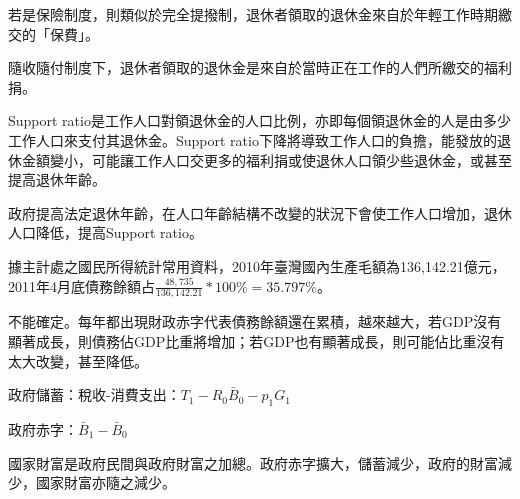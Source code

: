 \documentclass[12pt]{article}
\begin{document}
\begin{CJK}{UTF8}{cwmb}
\begin{num}
\item 
	\begin{num}
		\item 若是保險制度，則類似於完全提撥制，退休者領取的退休金來自於年輕工作時期繳交的「保費」。
		\item 隨收隨付制度下，退休者領取的退休金是來自於當時正在工作的人們所繳交的福利捐。
		\item Support ratio是工作人口對領退休金的人口比例，亦即每個領退休金的人是由多少工作人口來支付其退休金。Support ratio下降將導致工作人口的負擔，能發放的退休金額變小，可能讓工作人口交更多的福利捐或使退休人口領少些退休金，或甚至提高退休年齡。
		\item 政府提高法定退休年齡，在人口年齡結構不改變的狀況下會使工作人口增加，退休人口降低，提高Support ratio。
	\end{num}
\item 
	\begin{num}
		\item 據主計處之國民所得統計常用資料，2010年臺灣國內生產毛額為136,142.21億元，2011年4月底債務餘額占$\frac{48,735}{136,142.21}*100\% = 35.797\%$。
		\item 不能確定。每年都出現財政赤字代表債務餘額還在累積，越來越大，若GDP沒有顯著成長，則債務佔GDP比重將增加；若GDP也有顯著成長，則可能佔比重沒有太大改變，甚至降低。
	\end{num}
\item 
	\begin{num}
		\item
			\begin{num}
				\item 政府儲蓄：稅收-消費支出：$T_1-R_0\bar{B}_0-p_1G_1$
				\item 政府赤字：$\bar{B}_1-\bar{B}_0$
			\end{num} 
		\item 國家財富是政府民間與政府財富之加總。政府赤字擴大，儲蓄減少，政府的財富減少，國家財富亦隨之減少。
	\end{num}
\end{num}

\end{CJK}
\end{document}
